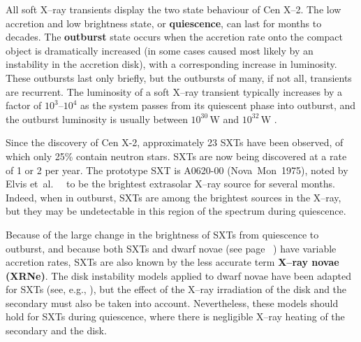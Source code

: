 \vspace{\myparskip}

All soft X--ray transients display the two state behaviour of Cen X--2. The low
accretion and low brightness state, or
\textbf{quiescence}, can last for months to decades. The \textbf{outburst}
state occurs when the accretion rate onto the
compact object is dramatically increased (in some cases caused most
likely by an instability in the accretion disk), with a corresponding increase in luminosity.
These outbursts last only briefly, but the outbursts of many, if not all, transients are recurrent.
 The luminosity of a soft X--ray transient typically increases by a factor
of $10^3$--$10^4$ as the system passes from its quiescent phase into
outburst, and the outburst luminosity is usually between
$10^{30}\,\mathrm{W}$ and $10^{32}\,\mathrm{W}$ %
\cite{TanakaLewin:1995}. %

\vspace{\myparskip}

Since the discovery of Cen X-2, approximately 23 SXTs have been
observed, of which only 25\% contain neutron stars. SXTs are now being
discovered at a rate of 1 or 2 per year. The prototype SXT is A0620-00
(\mbox{Nova Mon 1975}), noted by Elvis et~al.\ %
\citeyear{Elvis_et_al.:1975}%
\ to be the brightest extrasolar X--ray source for several months. %
Indeed, when in outburst, SXTs are among the brightest sources in the X--ray, but they may be undetectable in this region of the spectrum during quiescence. %

\vspace{\myparskip}

Because of the large change in the brightness of SXTs from quiescence
to outburst, and because both SXTs and dwarf novae (see page~%
\pageref{cha:Introduction:sec:X--rayBinaries:subsec:CompactObjects:topic:DwarfNovae}%
) have variable accretion rates, SXTs are also known by the less accurate term \textbf{X--ray novae
(XRNe)}. The disk instability models applied to dwarf novae have been adapted for
SXTs (see, e.g., %
%
), but the effect of the X--ray irradiation of the disk and the secondary must
also be taken into account. Nevertheless, these models should hold for SXTs during quiescence,
where there is negligible X--ray heating of the secondary and the
disk. %

\vspace{\myparskip}


